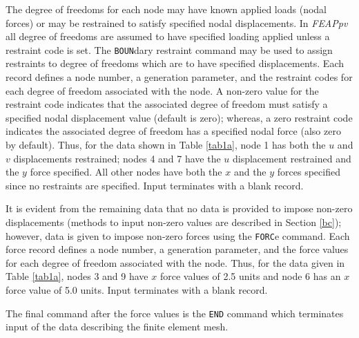 The degree of freedoms for each node may have known applied loads (nodal
forces) or may be restrained to satisfy specified nodal displacements.
In {\sl FEAPpv} all degree of freedoms are assumed to have specified loading
applied unless a restraint code is set.  The {\tt BOUN}dary restraint
command may be used to assign restraints to degree of freedoms which are
to have specified displacements.
Each record defines a node number, a generation parameter,
and the restraint codes for each degree of freedom associated with
the node. A non-zero value for the restraint code 
indicates that the associated degree of freedom must satisfy a specified
nodal displacement value (default is zero); whereas, a zero restraint
code indicates the associated degree of freedom has a specified nodal
force (also zero by default).  Thus, for the data shown in Table \ref{tab1a},
node 1 has both the $u$ and $v$ displacements restrained; nodes 4 and 7
have the $u$ displacement restrained and the $y$ force specified.  All
other nodes have both the $x$ and the $y$ forces specified since no
restraints are specified.
Input terminates with a blank record.

It is evident from the remaining data that
no data is provided to impose non-zero displacements (methods to input
non-zero values are described in Section \ref{bc}); however, data is given to
impose non-zero forces using the {\tt FORC}e command.  
Each force record defines a node number, a generation parameter,
and the force values for each degree of freedom associated with
the node.  Thus, for the data given in Table \ref{tab1a}, nodes 3 and 9 have
$x$ force values of 2.5 units and node 6 has an $x$ force value of 5.0
units. Input terminates with a blank record.

The final command after the force values is the {\tt END} command which
terminates input of the data describing the finite element mesh.


